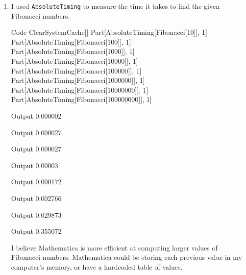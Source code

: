 \documentclass[11pt,twoside,openany]{memoir}
\begin{document}
\begin{enumerate}[label = (\roman*),itemsep=1pt,topsep=3pt]
    \newpage
    \item I used \texttt{AbsoluteTiming} to measure the time it takes to find the given Fibonacci numbers.
\begin{mmaCell}[functionlocal=y]{Code}
ClearSystemCache[]
Part[AbsoluteTiming[Fibonacci[10]], 1]
Part[AbsoluteTiming[Fibonacci[100]], 1]
Part[AbsoluteTiming[Fibonacci[1000]], 1]
Part[AbsoluteTiming[Fibonacci[10000]], 1]
Part[AbsoluteTiming[Fibonacci[100000]], 1]
Part[AbsoluteTiming[Fibonacci[1000000]], 1]
Part[AbsoluteTiming[Fibonacci[10000000]], 1]
Part[AbsoluteTiming[Fibonacci[100000000]], 1]
\end{mmaCell}
\begin{mmaCell}{Output}
0.000002
\end{mmaCell}
\begin{mmaCell}{Output}
0.000027
\end{mmaCell}
\begin{mmaCell}{Output}
0.000027
\end{mmaCell}
\begin{mmaCell}{Output}
0.00003
\end{mmaCell}
\begin{mmaCell}{Output}
0.000172
\end{mmaCell}
\begin{mmaCell}{Output}
0.002766
\end{mmaCell}
\begin{mmaCell}{Output}
0.029873
\end{mmaCell}
\begin{mmaCell}{Output}
0.355072
\end{mmaCell}
        I believe Mathematica is more efficient at computing larger values of Fibonacci numbers. Mathematica could be storing each previous value in my computer's memory, or have a hardcoded table of values.


\end{enumerate}
\end{document}
